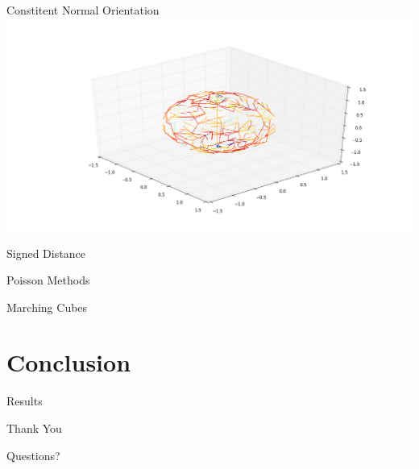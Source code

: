 \documentclass{beamer}
\begin{document}
\begin{frame}{Constitent Normal Orientation}
  \includegraphics[width=\textwidth]{mst.png}
\end{frame}

\begin{frame}{Signed Distance}
\end{frame}

\begin{frame}{Poisson Methods}
\end{frame}

\begin{frame}{Marching Cubes}
\end{frame}

\section{Conclusion}

\begin{frame}{Results}
\end{frame}

\begin{frame}{Thank You}
\end{frame}

\begin{frame}{Questions?}
\end{frame}
  
\end{document}
